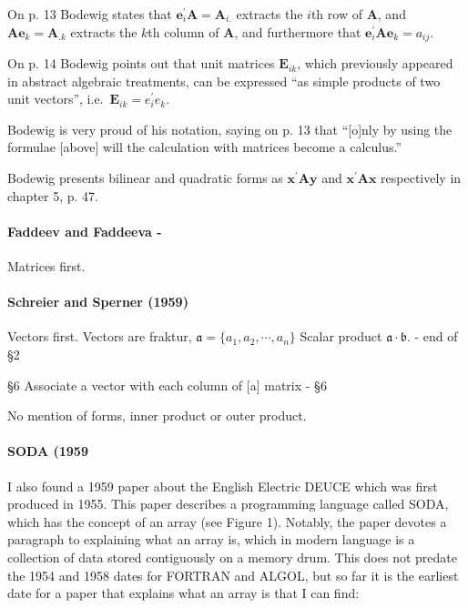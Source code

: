 On p. 13 Bodewig states that $\mathbf e^\prime_i \mathbf A = \mathbf A_{i.}$
extracts the $i$th row of $\mathbf A$, and $\mathbf A \mathbf e_k = \mathbf A_{.k}$
extracts the $k$th column of $\mathbf A$, and furthermore that
$\mathbf e^\prime_i \mathbf A \mathbf e_k = a_{ij}$.

On p. 14 Bodewig points out that unit matrices $\mathbf E_{ik}$, which previously
appeared in abstract algebraic treatments, can be expressed ``as simple products
of two unit vectors'', i.e.\ $\mathbf E_{ik} = e^\prime_i e_k$.

Bodewig is very proud of his notation, saying on p. 13 that
``[o]nly by using the formulae [above] will the calculation with matrices become a calculus.''

Bodewig presents bilinear and quadratic forms as $\mathbf{x^\prime A y}$ and
$\mathbf{x^\prime A x}$ respectively in chapter 5, p. 47.



\paragraph{Faddeev and Faddeeva - \cite{Faddeev1959}}

Matrices first.



\paragraph{Schreier and Sperner (1959)~\cite{Schreier1959}}

Vectors first.
Vectors are fraktur, $\mathfrak a = \{a_1, a_2, \cdots, a_n\}$
Scalar product $\mathfrak a \cdot \mathfrak b$. - end of \S 2

\S6 Associate a vector with each column of [a] matrix - \S 6

No mention of forms, inner product or outer product.



\paragraph{SODA (1959}

I also found a 1959 paper about the English Electric DEUCE which
was first produced in 1955. This paper describes a programming
language called SODA, which has the concept of an array (see Figure
1). Notably, the paper devotes a paragraph to explaining what an array
is, which in modern language is a collection of data stored
contiguously on a memory drum. This does not predate the 1954 and 1958
dates for FORTRAN and ALGOL, but so far it is the earliest date for a
paper that explains what an array is that I can find:

